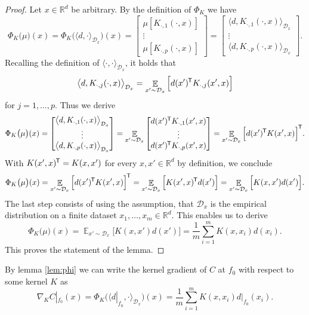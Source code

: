 \documentclass[11pt, a4paper]{article}
\newcommand{\R}{\mathbb{R}}
\newcommand{\D}{\mathcal{D}}
\newcommand*{\tr}{^{\mkern-1.5mu\mathsf{T}}}
\DeclareMathOperator*{\E}{\mathbb{E}}
\begin{document}
\begin{proof}
Let $x \in \R^d$ be arbitrary. By the definition of $\Phi_K$ we have
\[ \Phi_K \big ( \mu \big )(x) = \Phi_K \Big ( \langle d, \cdot \rangle_{\D_x} \Big )(x) = \begin{bmatrix} \mu [K_{\cdot,1}(\cdot,x) ] \\ \vdots \\ \mu [ K_{\cdot,p}(\cdot,x)] \end{bmatrix} = \begin{bmatrix} \big \langle d, K_{\cdot,1}(\cdot,x) \big \rangle_{\D_x} \\ \vdots \\ \big \langle d, K_{\cdot,p}(\cdot,x) \big \rangle_{\D_x} \end{bmatrix}. \]
Recalling the definition of $\langle \cdot , \cdot \rangle_{\D_x}$, it holds that
\[ \big \langle d, K_{\cdot,j}(\cdot,x) \big \rangle_{\D_x} = \E_{x' \sim \D_x} \Big [ d(x')\tr K_{\cdot,j}(x',x) \Big ] \]
for $j = 1, \dots, p$. Thus we derive
\[ \Phi_K \big ( \mu \big )(x) = \begin{bmatrix} \big \langle d, K_{\cdot,1}(\cdot,x) \big \rangle_{\D_x} \\ \vdots \\ \big \langle d, K_{\cdot,p}(\cdot,x) \big \rangle_{\D_x} \end{bmatrix} = \E_{x' \sim \D_x} \begin{bmatrix} d(x')\tr K_{\cdot,1}(x',x) \\ \vdots \\ d(x')\tr K_{\cdot,p}(x',x) \end{bmatrix} = \E_{x' \sim \D_x} \Big [ d(x')\tr  K(x',x) \Big ]\tr . \]
With $K(x',x)\tr  = K(x,x')$ for every $x,x' \in \R^d$ by definition, we conclude
\[ \Phi_K \big ( \mu \big )(x) = \E_{x' \sim \D_x} \Big [ d(x')\tr  K(x',x) \Big ]\tr  = \E_{x' \sim \D_x} \Big [ K(x',x)\tr d(x') \Big ] = \E_{x' \sim \D_x} \Big [ K(x,x')d(x') \Big ]. \]
The last step consists of using the assumption, that $\D_x$ is the empirical distribution on a finite dataset $x_1, \dots, x_m \in \R^d$. This enables us to derive
\[ \Phi_K \big ( \mu \big )(x) = \E_{x' \sim \D_x} \Big [ K(x,x')d(x') \Big ] = \frac{1}{m}\sum_{i=1}^{m} K(x,x_i)d(x_i). \]
This proves the statement of the lemma.
\end{proof}

By lemma \ref{lem:phi} we can write the kernel gradient of $C$ at $f_0$ with respect to some kernel $K$ as
\[ \nabla_KC|_{f_0}(x) = \Phi_K \Big ( \big \langle d|_{f_0} , \cdot \big \rangle_{\D_x} \Big )(x) = \frac{1}{m} \sum_{i=1}^{m} K(x,x_i)d|_{f_0}(x_i). \]
\end{document}
